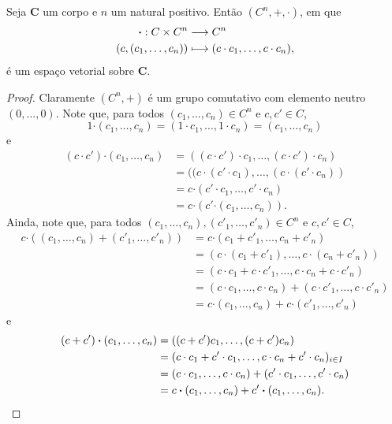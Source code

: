 \begin{prop}
Seja $\bm C$ um corpo e $n$ um natural positivo. Então $(C^n,+,\bm\cdot)$, em que
	\begin{align*}
	{\bm\cdot}: {C \times C^n} &\longrightarrow {C^n} \\{(c,(c_1,\ldots,c_n))} &\longmapsto {(c \cdot c_1,\ldots,c \cdot c_n),}
	\end{align*}
é um espaço vetorial sobre $\bm C$.
\end{prop}
\begin{proof}
	Claramente $(C^n,+)$ é um grupo comutativo com elemento neutro $(0,\ldots,0)$. Note que, para todos $(c_1,\ldots,c_n) \in C^n$ e $c,c' \in C$,
	\begin{equation*}
	1 \bm\cdot (c_1,\ldots,c_n) = (1 \cdot c_1,\ldots,1 \cdot c_n) = (c_1,\ldots,c_n)
	\end{equation*}
e
	\begin{align*}
	(c \cdot c') \bm\cdot (c_1,\ldots,c_n) &= ((c \cdot c') \cdot c_1, \ldots, (c \cdot c') \cdot c_n) \\
	&= ((c \cdot (c' \cdot c_1), \ldots, (c \cdot (c' \cdot c_n)) \\
	&= c \bm\cdot (c' \cdot c_1,\ldots,c' \cdot c_n) \\
	&= c \bm\cdot (c' \bm\cdot (c_1,\ldots,c_n)).
	\end{align*}
	Ainda, note que, para todos $(c_1,\ldots,c_n), (c'_1,\ldots,c'_n) \in C^n$ e $c,c' \in C$,
	\begin{align*}
	c \bm\cdot ((c_1,\ldots,c_n) + (c'_1,\ldots,c'_n)) &= c \bm\cdot (c_1+c'_1,\ldots,c_n+c'_n) \\
	&= (c \cdot (c_1+c'_1),\ldots,c \cdot (c_n+c'_n)) \\
	&= (c \cdot c_1 + c \cdot c'_1,\ldots,c \cdot c_n + c \cdot c'_n) \\
	&= (c \cdot c_1,\ldots,c \cdot c_n) + (c \cdot c'_1,\ldots,c \cdot c'_n) \\
	&= c \bm\cdot (c_1,\ldots,c_n) + c \bm\cdot (c'_1,\ldots,c'_n)
	\end{align*}
e
	\begin{align*}
	(c+c') \bm\cdot (c_1,\ldots,c_n) &= ((c+c')c_1,\ldots,(c+c')c_n) \\
	&= (c \cdot c_1 + c' \cdot c_1,\ldots,c \cdot c_n + c' \cdot c_n)_{i \in I} \\
	&= (c \cdot c_1,\ldots,c \cdot c_n) + (c' \cdot c_1,\ldots,c' \cdot c_n) \\
	&= c \bm\cdot (c_1,\ldots,c_n) + c' \bm\cdot (c_1,\ldots,c_n).  \qedhere
	\end{align*}
\end{proof}

